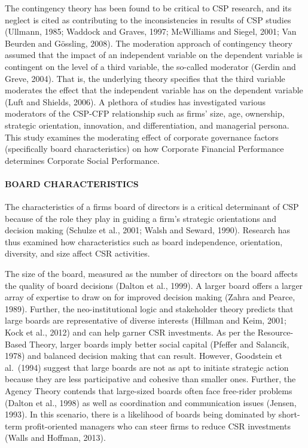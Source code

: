 \documentclass[
]{mitthesis}
\begin{document}
The contingency theory has been found to be critical to CSP research, and its neglect is cited as contributing to the inconsistencies in results of CSP studies (Ullmann, 1985; Waddock and Graves, 1997; McWilliams and Siegel, 2001; Van Beurden and Gössling, 2008). The moderation approach of contingency theory assumed that the impact of an independent
variable on the dependent variable is contingent on the level of a third variable, the so-called moderator (Gerdin and Greve, 2004). That is, the underlying theory specifies that the third variable moderates the effect that the independent variable has on the dependent variable (Luft and Shields, 2006). A plethora of studies has investigated various moderators of the CSP-CFP relationship such as firms' size, age, ownership, strategic orientation, innovation, and differentiation, and managerial persona. This study examines the moderating effect of corporate governance factors (specifically board characteristics) on how Corporate Financial Performance determines Corporate Social Performance.

\hypertarget{board-characteristics}{%
\paragraph{BOARD CHARACTERISTICS}\label{board-characteristics}}

The characteristics of a firms board of directors is a critical determinant of CSP because of the role they play in guiding a firm's strategic orientations and decision making (Schulze et al., 2001; Walsh and Seward, 1990). Research has thus examined how characteristics such as board independence, orientation, diversity, and size affect CSR activities.

The size of the board, measured as the number of directors on the board affects the quality of board decisions (Dalton et al., 1999). A larger board offers a larger array of expertise to draw on for improved decision making (Zahra and Pearce, 1989). Further, the neo-institutional logic and stakeholder theory predicts that large boards are representative of diverse interests (Hillman and Keim, 2001; Kock et al., 2012) and can help garner CSR investments. As per the Resource-Based Theory, larger boards imply better social capital (Pfeffer and Salancik, 1978) and balanced decision making that can result. However, Goodstein et al.~(1994) suggest that large boards are not as apt to initiate strategic action because they are less participative and cohesive than smaller ones. Further, the Agency Theory contends that large-sized boards often face free-rider problems (Dalton et al., 1998) as well as coordination and communication issues (Jensen, 1993). In this scenario, there is a likelihood of boards being dominated by short-term profit-oriented managers who can steer firms to reduce CSR investments (Walls and Hoffman, 2013).
\end{document}
